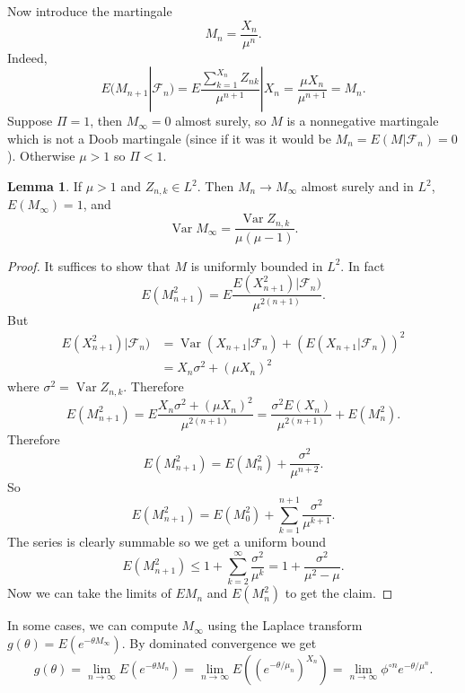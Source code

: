 \documentclass[12pt]{book}
\DeclareMathOperator{\Var}{Var}
\theoremstyle{definition}
\newtheorem{lemma}[theorem]{Lemma}
\begin{document}
Now introduce the martingale
$$M_n = \frac{X_n}{\mu^n}.$$
Indeed,
$$E(M_{n+1}|\mathcal F_n) = E\frac{\sum_{k=1}^{X_n} Z_{nk}}{\mu^{n+1}}|X_n = \frac{\mu X_n}{\mu^{n+1}} = M_n.$$
Suppose $\Pi = 1$, then $M_\infty = 0$ almost surely, so $M$ is a nonnegative martingale which is not a Doob martingale (since if it was it would be $M_n = E(M|\mathcal F_n) = 0$).
Otherwise $\mu > 1$ so $\Pi < 1$.

\begin{lemma}
If $\mu > 1$ and $Z_{n,k} \in L^2$.
Then $M_n \to M_\infty$ almost surely and in $L^2$, $E(M_\infty) = 1$, and
$$\Var M_\infty = \frac{\Var Z_{n,k}}{\mu(\mu - 1)}.$$
\end{lemma}
\begin{proof}
It suffices to show that $M$ is uniformly bounded in $L^2$.
In fact
$$E(M_{n+1}^2) = E\frac{E(X_{n+1}^2)|\mathcal F_n)}{\mu^{2(n+1)}}.$$
But
\begin{align*}
E(X_{n+1}^2)|\mathcal F_n) &= \Var(X_{n+1}|\mathcal F_n) + (E(X_{n+1}|\mathcal F_n))^2 \\
&= X_n \sigma^2 + (\mu X_n)^2
\end{align*}
where $\sigma^2 = \Var Z_{n,k}$.
Therefore
$$E(M_{n+1}^2) = E\frac{X_n \sigma^2 + (\mu X_n)^2}{\mu^{2(n+1)}} = \frac{\sigma^2 E(X_n)}{\mu^{2(n+1)}} + E(M_n^2).$$
Therefore
$$E(M_{n+1}^2) = E(M_n^2) + \frac{\sigma^2}{\mu^{n+2}}.$$
So
$$E(M_{n+1}^2) = E(M_0^2) + \sum_{k=1}^{n+1} \frac{\sigma^2}{\mu^{k+1}}.$$
The series is clearly summable so we get a uniform bound
$$E(M_{n+1}^2) \leq 1 + \sum_{k=2}^\infty \frac{\sigma^2}{\mu^k} = 1 + \frac{\sigma^2}{\mu^2 - \mu}.$$
Now we can take the limits of $EM_n$ and $E(M_n^2)$ to get the claim.
\end{proof}

In some cases, we can compute $M_\infty$ using the Laplace transform $g(\theta) = E(e^{-\theta M_\infty})$.
By dominated convergence we get
$$g(\theta) = \lim_{n \to \infty} E(e^{-\theta M_n}) = \lim_{n \to \infty} E((e^{-\theta/\mu_n})^{X_n}) = \lim_{n \to \infty} \phi^{\circ n}e^{-\theta/\mu^n}.$$
\end{document}
